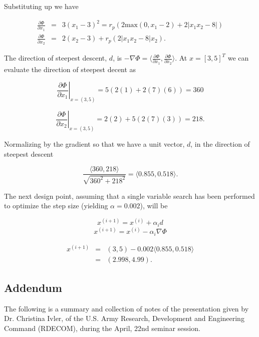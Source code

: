 \documentclass{article}
\begin{document}
Substituting up we have

\begin{eqnarray*} 
\frac{\partial \Phi}{\partial x_1} &=& 3(x_1 - 3)^2 =r_p(2 \mbox{max}(0, x_1-2) + 2|x_1x_2 -8|) \\
\frac{\partial \Phi}{\partial x_2} &=& 2(x_2 -3) +r_p(2|x_1x_2 - 8|x_2).
\end{eqnarray*}

The direction of steepest descent, $d$, is
$- \nabla \Phi = \langle \frac{\partial \Phi}{\partial x_1}, \frac{\partial \Phi}{\partial x_2} \rangle$.
At $x = [3,5]^T$ we can evaluate the direction of steepest decent as

\[\left. \frac{\partial \Phi}{\partial x_1}\right|_{x=(3,5)} = 5(2(1) + 2(7)(6)) = 360\]

\[\left. \frac{\partial \Phi}{\partial x_2}\right|_{x=(3,5)} = 2(2) + 5(2(7)(3)) = 218. \]

Normalizing by the gradient so that we have a unit vector, $d$, in the
direction of steepest descent

\[\frac{\langle 360, 218 \rangle}{\sqrt{360^2 + 218^2}} = \langle 0.855, 0.518 \rangle .\]

The next design point, assuming that a single variable search has been
performed to optimize the step size (yielding $\alpha = 0.002$), will be

\[x^{(i+1)} = x^{(i)} + \alpha_i d\]
\[x^{(i+1)} = x^{(i)} - \alpha_i \nabla \Phi\]

\begin{eqnarray*} x^{(i+1)} &=& (3,5) - 0.002 \langle 0.855, 0.518 \rangle \\
                         &=& (2.998, 4.99). \end{eqnarray*}

\subsection*{Addendum}\label{addendum}
The following is a summary and collection of notes of the presentation given by Dr. Christina Ivler, of the U.S. Army Research, Development and Engineering Command (RDECOM), during the April, 22nd seminar session.
\end{document}
